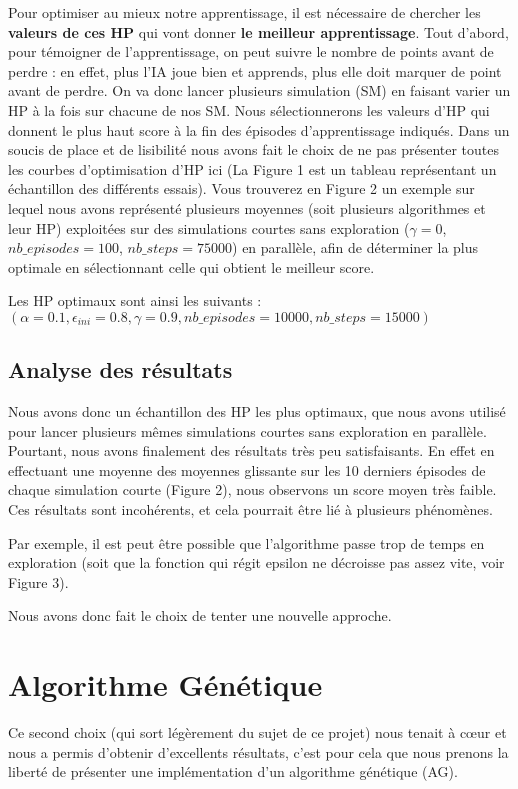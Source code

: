 \documentclass[12pt]{article}
\begin{document}
\begin{page}
Pour optimiser au mieux notre apprentissage, il est nécessaire de chercher les \textbf{valeurs de ces HP} qui vont donner \textbf{le meilleur apprentissage}. Tout d'abord, pour témoigner de l’apprentissage, on peut suivre le nombre de points avant de perdre : en effet, plus l'IA joue bien et apprends, plus elle doit marquer de point avant de perdre.
On va donc lancer plusieurs simulation (SM) en faisant varier un HP à la fois sur chacune de nos SM. Nous sélectionnerons les valeurs d'HP qui donnent le plus haut score à la fin des épisodes d'apprentissage indiqués. Dans un soucis de place et de lisibilité nous avons fait le choix de ne pas présenter toutes les courbes d'optimisation d'HP ici (La Figure 1 est un tableau représentant un échantillon des différents essais). Vous trouverez en Figure 2 un exemple sur lequel nous avons représenté plusieurs moyennes (soit plusieurs algorithmes et leur HP) exploitées sur des simulations courtes sans exploration ($\gamma=0$, $nb\_episodes=100$, $nb\_steps=75000$) en parallèle, afin de déterminer la plus optimale en sélectionnant celle qui obtient le meilleur score.

Les HP optimaux sont ainsi les suivants : $(\alpha=0.1, \epsilon_{ini}=0.8, \gamma=0.9, nb\_episodes=10000, nb\_steps=15000)$

\subsection{Analyse des résultats}
Nous avons donc un échantillon des HP les plus optimaux, que nous avons utilisé pour lancer plusieurs mêmes simulations courtes sans exploration en parallèle. Pourtant, nous avons finalement des résultats très peu satisfaisants. En effet en effectuant une moyenne des moyennes glissante sur les 10 derniers épisodes de chaque simulation courte (Figure 2), nous observons un score moyen très faible. Ces résultats sont incohérents, et cela pourrait être lié à plusieurs phénomènes.

Par exemple, il est peut être possible que l'algorithme passe trop de temps en exploration (soit que la fonction qui régit epsilon ne décroisse pas assez vite, voir Figure 3).

 Nous avons donc fait le choix de tenter une nouvelle approche.

\section{Algorithme Génétique}
Ce second choix (qui sort légèrement du sujet de ce projet) nous tenait à cœur et nous a permis d'obtenir d'excellents résultats, c'est pour cela que nous prenons la liberté de présenter une implémentation d'un algorithme génétique (AG).


\end{page}
\end{document}
